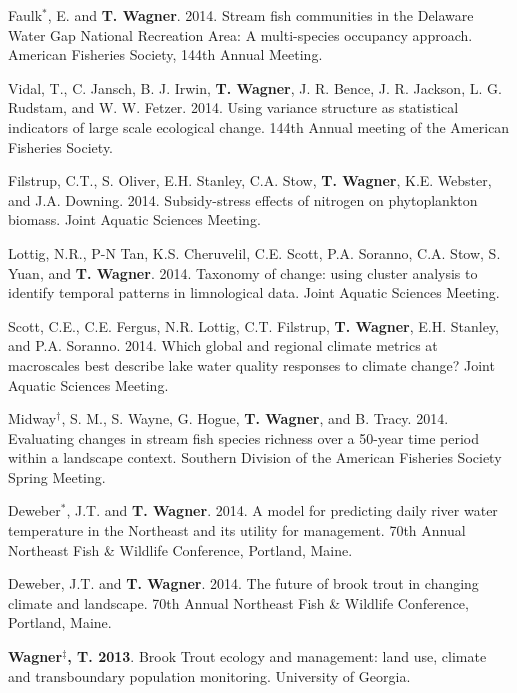 \documentclass[10pt]{article}
\begin{document}
\begin{flushleft}
\begin{etaremune}
\item Faulk$^*$, E. and {\bf T. Wagner}. 2014. Stream fish communities in the Delaware Water Gap National Recreation Area: A multi-species occupancy approach. American Fisheries Society, 144th Annual Meeting.

\item Vidal, T., C. Jansch, B. J. Irwin, {\bf T. Wagner}, J. R. Bence, J. R. Jackson, L. G. Rudstam, and W. W. Fetzer. 2014. Using variance structure as statistical indicators of large scale ecological change. 144th Annual meeting of the American Fisheries Society.  

\item Filstrup, C.T., S. Oliver, E.H. Stanley, C.A. Stow, {\bf T. Wagner}, K.E. Webster, and J.A. Downing. 2014. Subsidy-stress effects of nitrogen on phytoplankton biomass. Joint Aquatic Sciences Meeting. 

\item Lottig, N.R., P-N Tan, K.S. Cheruvelil, C.E. Scott, P.A. Soranno, C.A. Stow, S. Yuan, and {\bf T. Wagner}. 2014. Taxonomy of change: using cluster analysis to identify temporal patterns in limnological data. Joint Aquatic Sciences Meeting. 

\item Scott, C.E., C.E. Fergus, N.R. Lottig, C.T. Filstrup, {\bf T. Wagner}, E.H. Stanley, and P.A. Soranno. 2014. Which global and regional climate metrics at macroscales best describe lake water quality responses to climate change? Joint Aquatic Sciences Meeting. 

\item Midway$^\dagger$, S. M., S. Wayne, G. Hogue, {\bf T. Wagner}, and B. Tracy. 2014. Evaluating changes in stream fish species richness over a 50-year time period within a landscape context. Southern Division of the American Fisheries Society Spring Meeting. 

\item Deweber$^*$, J.T. and {\bf T. Wagner}. 2014. A model for predicting daily river water temperature in the Northeast and its utility for management. 70th Annual Northeast Fish \& Wildlife Conference, Portland, Maine.

\item Deweber, J.T. and  {\bf T. Wagner}. 2014. The future of brook trout in changing climate and landscape. 70th Annual Northeast Fish \& Wildlife Conference, Portland, Maine.


\item {\bf Wagner$^\ddagger$, T. 2013}. Brook Trout ecology and management: land use, climate and transboundary population monitoring. University of Georgia. 


\end{etaremune}
\end{flushleft}
\end{document}
